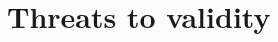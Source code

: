 \documentclass{sig-alternate-05-2015}
\begin{document}



\section{Threats to validity}
\label{cha:threats}


%
\end{document}
